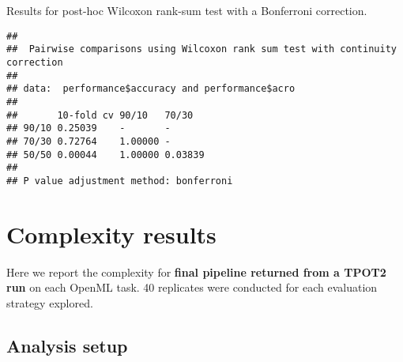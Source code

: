 \documentclass[
]{book}
\newenvironment{Shaded}{\begin{snugshade}}{\end{snugshade}}
\newcommand{\AttributeTok}[1]{\textcolor[rgb]{0.13,0.29,0.53}{#1}}
\newcommand{\ConstantTok}[1]{\textcolor[rgb]{0.56,0.35,0.01}{#1}}
\newcommand{\FunctionTok}[1]{\textcolor[rgb]{0.13,0.29,0.53}{\textbf{#1}}}
\newcommand{\NormalTok}[1]{#1}
\newcommand{\OtherTok}[1]{\textcolor[rgb]{0.56,0.35,0.01}{#1}}
\newcommand{\SpecialCharTok}[1]{\textcolor[rgb]{0.81,0.36,0.00}{\textbf{#1}}}
\newcommand{\StringTok}[1]{\textcolor[rgb]{0.31,0.60,0.02}{#1}}
\begin{document}
Results for post-hoc Wilcoxon rank-sum test with a Bonferroni correction.

\begin{Shaded}
\end{Shaded}

\begin{verbatim}
## 
##  Pairwise comparisons using Wilcoxon rank sum test with continuity correction 
## 
## data:  performance$accuracy and performance$acro 
## 
##       10-fold cv 90/10   70/30  
## 90/10 0.25039    -       -      
## 70/30 0.72764    1.00000 -      
## 50/50 0.00044    1.00000 0.03839
## 
## P value adjustment method: bonferroni
\end{verbatim}

\hypertarget{complexity-results}{%
\chapter{Complexity results}\label{complexity-results}}

Here we report the complexity for \textbf{final pipeline returned from a TPOT2 run} on each OpenML task.
40 replicates were conducted for each evaluation strategy explored.

\hypertarget{analysis-setup-1}{%
\section{Analysis setup}\label{analysis-setup-1}}

\begin{Shaded}
\end{Shaded}
\end{document}
